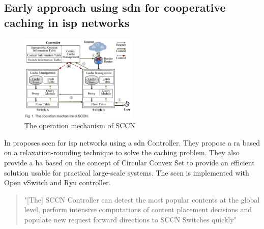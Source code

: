 \documentclass[conference]{IEEEtran}
\begin{document}
	\subsection{Early approach using \ac{sdn} for cooperative caching in \ac{isp} networks}
	\label{sec:priority-caching}
	\begin{figure}
		\centering
		\includegraphics[width=0.5\textwidth]{figures/sccn-architecture.png}
		\caption{The operation mechanism of SCCN \cite{caching-7}}
		\label{fig:sccn-architecture}
	\end{figure}

	In \citeyear{caching-7} \cite{caching-7} proposes \ac{sccn} for \ac{isp} networks using a \ac{sdn} Controller. They propose a \ac{ra} based on a relaxation-rounding technique \cite{ra} to solve the caching problem. They also provide a \ac{ha} based on the concept of Circular Convex Set \cite{heuristcs} to provide an efficient solution usable for practical large-scale systems. The \ac{sccn} is implemented with Open vSwitch and Ryu controller.

	\begin{quote}
		"[The] SCCN Controller can detect the most popular contents at the global level, perform intensive computations of content placement decisions and populate new request forward directions to SCCN Switches quickly" \cite{caching-7}
	\end{quote}
\end{document}
